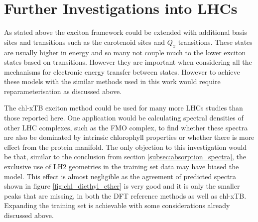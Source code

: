 \section{Further Investigations into LHCs}
\label{sec:lhc_investigations}

As stated above the exciton framework could be extended with additional basis sites
and transitions such as the carotenoid sites and $Q_x$ transitions. These states 
are usually higher in energy and so many not couple much to the lower exciton states
based on \Qy transitions. However they are important when considering all the mechanisms
for electronic energy transfer between states. However to achieve these models with
the similar methods used in this work would require reparameterisation as discussed
above.

The chl-xTB exciton method could be used for many more LHCs studies than those reported
here. One application would be calculating spectral densities of other LHC complexes,
such as the FMO complex, to find whether these spectra are also be dominated by
intrinsic chlorophyll properties or whether there is more effect from the protein 
manifold. The only objection to this investigation would be that, similar to the 
conclusion from section \ref{subsec:absorption_spectra}, the exclusive use of LH2
geometries in the training set data may have biased the model. This effect is almost
negligible as the agreement of predicted spectra shown in figure \ref{fig:chl_diethyl_ether}
is very good and it is only the smaller \Qy peaks that are missing, in both the
DFT reference methods as well as chl-xTB. Expanding the training set is achievable
with some considerations already discussed above.

